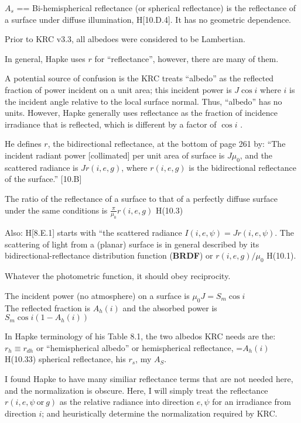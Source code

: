 $A_s$ == Bi-hemispherical reflectance (or spherical reflectance) is the
reflectance of a surface under diffuse illumination, H[10.D.4]. It has no
geometric dependence.

Prior to KRC v3.3, all albedoes were considered to be Lambertian.  

In general, Hapke uses $r$ for ``reflectance'', however, there are many of them.

A potential source of confusion is the KRC treats ``albedo'' as the reflected
fraction of power incident on a unit area; this incident power is $J \cos i$
where $i$ is the incident angle relative to the local surface normal. Thus,
``albedo'' has no units. However, Hapke generally uses reflectance as the
fraction of incidence irradiance that is reflected, which is different by a
factor of $\cos i$ .

He defines $r$, the bidirectional reflectance, at the bottom of page 261 by:
``The incident radiant power [collimated] per unit area of surface is $J \mu_0$,
and the scattered radiance is $Jr(i,e,g)$, where $r(i,e,g)$ is the bidirectional
reflectance of the surface.'' [10.B]

The ratio of the reflectance of a surface to that of a perfectly diffuse surface
under the same conditions is $\frac{\pi}{\mu_0}r(i,e,g)$ H(10.3)

Also: H[8.E.1] starts with ``the scattered radiance $I(i,e,\psi)
=Jr(i,e,\psi)$.
The scattering of light from a (planar) surface is in general described by its
bidirectional-reflectance distribution function (\textbf{BRDF}) or
$r(i,e,g)/\mu_0$ H(10.1).

Whatever the photometric function, it should obey reciprocity.

The incident power (no atmosphere) on a surface is $\mu_0 J = S_m \cos i $
\\ The reflected fraction is $A_h(i)$ and the absorbed power is $S_m \cos i \left(1-A_h(i) \right)$


In Hapke terminology of his Table 8.1, the two albedos KRC needs are the:
\qi  $r_h \equiv r_{dh}$ or ``hemispherical albedo'' or hemispherical reflectance, =$A_h(i)$ H(10.33) 
\qi spherical reflectance, his $r_s$, my $A_S$. 

I found Hapke to have many similiar reflectance terms that are not needed 
here, and the normalization is obscure.  Here, I will simply treat the
reflectance $r(i,e,\psi \ \mathrm{or} \ g)$ as the relative radiance into
direction $e,\psi$ for an irradiance from direction $i$; and heuristically
determine the normalization required by KRC.

